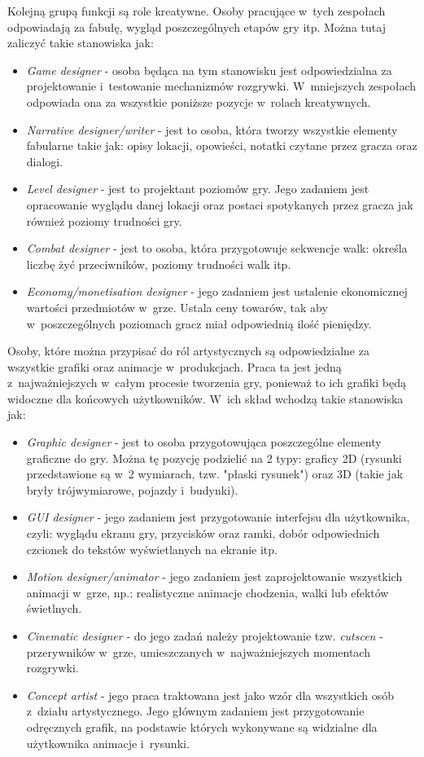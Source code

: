 \documentclass[12pt,a4paper,oneside]{book}
\theoremstyle{definition}
\numberwithin{equation}{chapter}
\begin{document}
\par Kolejną grupą funkcji są role kreatywne. Osoby pracujące w~tych zespołach odpowiadają za fabułę, wygląd poszczególnych etapów gry itp. Można tutaj zaliczyć takie stanowiska jak:
\begin{itemize}
    \item \textit{Game designer} - osoba będąca na tym stanowisku jest odpowiedzialna za projektowanie i~testowanie mechanizmów rozgrywki. W~mniejszych zespołach odpowiada ona za wszystkie poniższe pozycje w~rolach kreatywnych.
    \item \textit{Narrative designer/writer} - jest to osoba, która tworzy wszystkie elementy fabularne takie jak: opisy lokacji, opowieści, notatki czytane przez gracza oraz dialogi.
    \item \textit{Level designer} - jest to projektant poziomów gry. Jego zadaniem jest opracowanie wyglądu danej lokacji oraz postaci spotykanych przez gracza jak również poziomy trudności gry.
    \item \textit{Combat designer} - jest to osoba, która przygotowuje sekwencje walk: określa liczbę żyć przeciwników, poziomy trudności walk itp.
    \item \textit{Economy/monetisation designer} - jego zadaniem jest ustalenie ekonomicznej wartości przedmiotów w~grze. Ustala ceny towarów, tak aby w~poszczególnych poziomach gracz miał odpowiednią ilość pieniędzy.
\end{itemize}

\par Osoby, które można przypisać do ról artystycznych są odpowiedzialne za wszystkie grafiki oraz animacje w~produkcjach. Praca ta jest jedną z~najważniejszych w~całym procesie tworzenia gry, ponieważ to ich grafiki będą widoczne dla końcowych użytkowników. W~ich skład wchodzą takie stanowiska jak:
\begin{itemize}
    \item \textit{Graphic designer} - jest to osoba przygotowująca poszczególne elementy graficzne do gry. Można tę pozycję podzielić na 2 typy: graficy 2D (rysunki przedstawione są w~2 wymiarach, tzw. "płaski rysunek") oraz 3D (takie jak bryły trójwymiarowe, pojazdy i~budynki).
    \item \textit{GUI designer} - jego zadaniem jest przygotowanie interfejsu dla użytkownika, czyli: wyglądu ekranu gry, przycisków oraz ramki, dobór odpowiednich czcionek do tekstów wyświetlanych na ekranie itp.
    \item \textit{Motion designer/animator} - jego zadaniem jest zaprojektowanie wszystkich animacji w~grze, np.: realistyczne animacje chodzenia, walki lub efektów świetlnych.
    \item \textit{Cinematic designer} - do jego zadań należy projektowanie tzw. \textit{cutscen}\cite{Cutscena} - przerywników w~grze, umieszczanych w~najważniejszych momentach rozgrywki.
    \item \textit{Concept artist} - jego praca traktowana jest jako wzór dla wszystkich osób z~działu artystycznego. Jego głównym zadaniem jest przygotowanie odręcznych grafik, na podstawie których wykonywane są widzialne dla użytkownika animacje i~rysunki.
\end{itemize}
\end{document}
